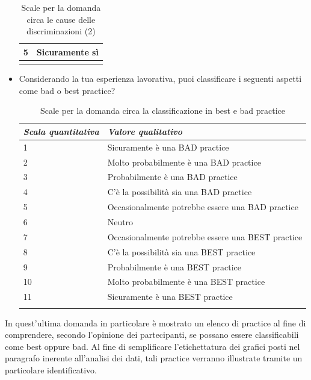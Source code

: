 \begin{itemize}
\begin{longtable}{| p{} | p{} |}
        5 & Sicuramente sì
        \\ \hline
        \caption{Scale per la domanda circa le cause delle discriminazioni (2)} %
        \label{tab:myfirstlongtable}
    \end{longtable}
    \item Considerando la tua esperienza lavorativa, puoi classificare i seguenti aspetti come bad o best practice?
    \begin{longtable}{| p{} | p{} |}
      \hline\textbf{\textit{Scala quantitativa}} & \textbf{\textit{Valore qualitativo}}
        \\ \hline
        \rowcolor{Gray!30}
        1 & Sicuramente è una BAD practice
        \\ \hline
        2 & Molto probabilmente è una BAD practice
        \\ \hline
        \rowcolor{Gray!30}
        3 & Probabilmente è una BAD practice
         \\ \hline
        4 & C'è la possibilità sia una BAD practice
        \\ \hline
        \rowcolor{Gray!30}
        5 & Occasionalmente potrebbe essere una BAD practice
        \\ \hline
        6 & Neutro
        \\ \hline
        \rowcolor{Gray!30}
        7 & Occasionalmente potrebbe essere una BEST practice
         \\ \hline
        8 & C'è la possibilità sia una BEST practice
        \\ \hline
        \rowcolor{Gray!30}
        9 & Probabilmente è una BEST practice
        \\ \hline
        10 & Molto probabilmente è una BEST practice
        \\ \hline
        \rowcolor{Gray!30}
        11 & Sicuramente è una BEST practice
         \\ \hline
        \caption{Scale per la domanda circa la classificazione in best e bad practice} %
        \label{tab:myfirstlongtable}
    \end{longtable}
\end{itemize}

In quest'ultima domanda in particolare è mostrato un elenco di practice al fine di comprendere, secondo l'opinione dei partecipanti, se possano essere classificabili come best oppure bad. Al fine di semplificare l'etichettatura dei grafici posti nel paragrafo inerente all'analisi dei dati, tali practice verranno illustrate tramite un particolare identificativo.

